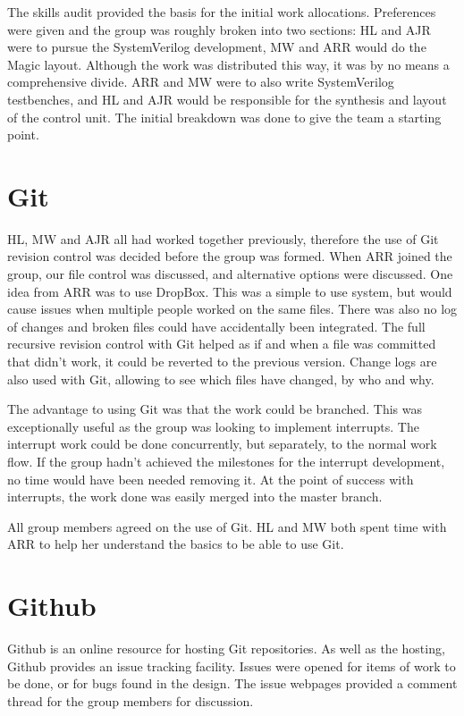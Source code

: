 The skills audit provided the basis for the initial work allocations.
Preferences were given and the group was roughly broken into two sections: HL and AJR were to pursue the SystemVerilog development, MW and ARR would do the Magic layout.
Although the work was distributed this way, it was by no means a comprehensive divide.
ARR and MW were to also write SystemVerilog testbenches, and HL and AJR would be responsible for the synthesis and layout of the control unit.
The initial breakdown was done to give the team a starting point.



\section{Git}

HL, MW and AJR all had worked together previously, therefore the use of Git revision control was decided before the group was formed. 
When ARR joined the group, our file control was discussed, and alternative options were discussed. 
One idea from ARR was to use DropBox. 
This was a simple to use system, but would cause issues when multiple people worked on the same files. 
There was also no log of changes and broken files could have accidentally been integrated. 
The full recursive revision control with Git helped as if and when a file was committed that didn't work, it could be reverted to the previous version.
Change logs are also used with Git, allowing to see which files have changed, by who and why. 


The advantage to using Git was that the work could be branched.
This was exceptionally useful as the group was looking to implement interrupts.
The interrupt work could be done concurrently, but separately, to the normal work flow. 
If the group hadn't achieved the milestones for the interrupt development, no time would have been needed removing it.
At the point of success with interrupts, the work done was easily merged into the master branch. 

All group members agreed on the use of Git. 
HL and MW both spent time with ARR to help her understand the basics to be able to use Git.


\section{Github}
Github is an online resource for hosting Git repositories. 
As well as the hosting, Github provides an issue tracking facility.
Issues were opened for items of work to be done, or for bugs found in the design.
The issue webpages provided a comment thread for the group members for discussion.

